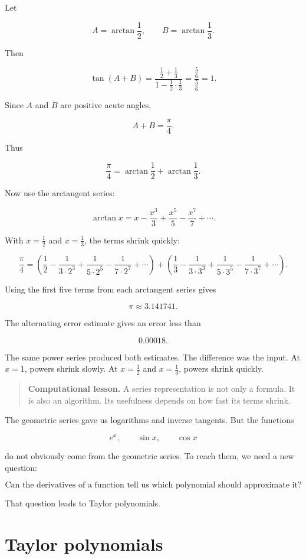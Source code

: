 Let

\[
A=\arctan\frac12,
\qquad
B=\arctan\frac13.
\]

Then

\[
\tan(A+B)
=
\frac{\frac12+\frac13}{1-\frac12\cdot\frac13}
=
\frac{\frac56}{\frac56}
=
1.
\]

Since \(A\) and \(B\) are positive acute angles,

\[
A+B=\frac{\pi}{4}.
\]

Thus

\[
\boxed{
\frac{\pi}{4}
=
\arctan\frac12+\arctan\frac13.
}
\]

Now use the arctangent series:

\[
\arctan x
=
x-\frac{x^3}{3}+\frac{x^5}{5}-\frac{x^7}{7}+\cdots.
\]

With \(x=\frac12\) and \(x=\frac13\), the terms shrink quickly:

\[
\frac{\pi}{4}
=
\left(
\frac12-\frac{1}{3\cdot2^3}+\frac{1}{5\cdot2^5}
-\frac{1}{7\cdot2^7}+\cdots
\right)
+
\left(
\frac13-\frac{1}{3\cdot3^3}+\frac{1}{5\cdot3^5}
-\frac{1}{7\cdot3^7}+\cdots
\right).
\]

Using the first five terms from each arctangent series gives

\[
\pi\approx 3.141741.
\]

The alternating error estimate gives an error less than

\[
0.00018.
\]

The same power series produced both estimates.  The difference was the input.  At
\(x=1\), powers shrink slowly.  At \(x=\frac12\) and \(x=\frac13\), powers shrink
quickly.

\begin{quote}
\textbf{Computational lesson.}
A series representation is not only a formula.  It is also an algorithm.  Its usefulness
depends on how fast its terms shrink.
\end{quote}

The geometric series gave us logarithms and inverse tangents.  But the functions

\[
e^x,\qquad \sin x,\qquad \cos x
\]

do not obviously come from the geometric series.  To reach them, we need a new
question:

\[
\boxed{
\text{Can the derivatives of a function tell us which polynomial should approximate it?}
}
\]

That question leads to Taylor polynomials.

\section{Taylor polynomials}
\label{sec:taylor-polynomials}

